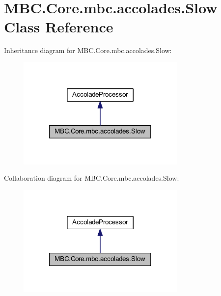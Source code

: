 \hypertarget{class_m_b_c_1_1_core_1_1mbc_1_1accolades_1_1_slow}{\section{M\-B\-C.\-Core.\-mbc.\-accolades.\-Slow Class Reference}
\label{class_m_b_c_1_1_core_1_1mbc_1_1accolades_1_1_slow}
}


Inheritance diagram for M\-B\-C.\-Core.\-mbc.\-accolades.\-Slow\-:\nopagebreak
\begin{figure}[H]
\begin{center}
\leavevmode
\includegraphics[width=234pt]{class_m_b_c_1_1_core_1_1mbc_1_1accolades_1_1_slow__inherit__graph}
\end{center}
\end{figure}


Collaboration diagram for M\-B\-C.\-Core.\-mbc.\-accolades.\-Slow\-:\nopagebreak
\begin{figure}[H]
\begin{center}
\leavevmode
\includegraphics[width=234pt]{class_m_b_c_1_1_core_1_1mbc_1_1accolades_1_1_slow__coll__graph}
\end{center}
\end{figure}
